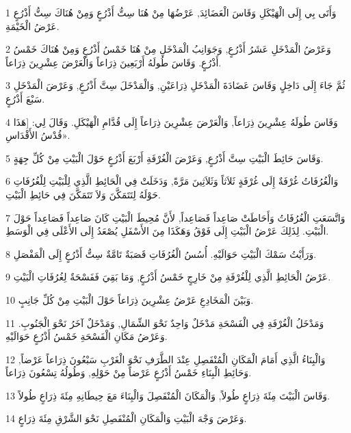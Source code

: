 \par 1 وَأَتَى بِي إِلَى الْهَيْكَلِ وَقَاسَ الْعَضَائِدَ, عَرْضُهَا مِنْ هُنَا سِتُّ أَذْرُعٍ وَمِنْ هُنَاكَ سِتُّ أَذْرُعٍ عَرْضُ الْخَيْمَةِ.
\par 2 وَعَرْضُ الْمَدْخَلِ عَشَرُ أَذْرُعٍ, وَجَوَانِبُ الْمَدْخَلِ مِنْ هُنَا خَمْسُ أَذْرُعٍ وَمِنْ هُنَاكَ خَمْسُ أَذْرُعٍ. وَقَاسَ طُولَهُ أَرْبَعِينَ ذِرَاعاً وَالْعَرْضَ عِشْرِينَ ذِرَاعاً.
\par 3 ثُمَّ جَاءَ إِلَى دَاخِلٍ وَقَاسَ عَضَادَةَ الْمَدْخَلِ ذِرَاعَيْنِ, وَالْمَدْخَلَ سِتَّ أَذْرُعٍ, وَعَرْضَ الْمَدْخَلِ سَبْعَ أَذْرُعٍ.
\par 4 وَقَاسَ طُولَهُ عِشْرِينَ ذِرَاعاً, وَالْعَرْضَ عِشْرِينَ ذِرَاعاً إِلَى قُدَّامِ الْهَيْكَلِ. وَقَالَ لِي: [هَذَا قُدْسُ الأَقْدَاسِ».
\par 5 وَقَاسَ حَائِطَ الْبَيْتِ سِتَّ أَذْرُعٍ, وَعَرْضَ الْغُرْفَةِ أَرْبَعَ أَذْرُعٍ حَوْلَ الْبَيْتِ مِنْ كُلِّ جِهَةٍ.
\par 6 وَالْغُرُفَاتُ غُرْفَةٌ إِلَى غُرْفَةٍ ثَلاَثاً وَثَلاَثِينَ مَرَّةً, وَدَخَلَتْ فِي الْحَائِطِ الَّذِي لِلْبَيْتِ لِلْغُرُفَاتِ حَوْلَهُ لِتَتَمَكَّنَ وَلاَ تَتَمَكَّنَ فِي حَائِطِ الْبَيْتِ.
\par 7 وَاتَّسَعَتِ الْغُرُفَاتُ وَأَحَاطَتْ صَاعِداً فَصَاعِداً, لأَنَّ مُحِيطَ الْبَيْتِ كَانَ صَاعِداً فَصَاعِداً حَوْلَ الْبَيْتِ. لِذَلِكَ عَرْضُ الْبَيْتِ إِلَى فَوْقُ وَهَكَذَا مِنَ الأَسْفَلِ يُصْعَدُ إِلَى الأَعْلَى فِي الْوَسَطِ.
\par 8 وَرَأَيْتُ سَمْكَ الْبَيْتِ حَوَالَيْهِ. أُسُسُ الْغُرُفَاتِ قَصَبَةٌ تَامَّةٌ سِتُّ أَذْرُعٍ إِلَى الْمَفْصَلِ.
\par 9 عَرْضُ الْحَائِطِ الَّذِي لِلْغُرْفَةِ مِنْ خَارِجٍ خَمْسُ أَذْرُعٍ, وَمَا بَقِيَ فَفَسْحَةٌ لِغُرُفَاتِ الْبَيْتِ.
\par 10 وَبَيْنَ الْمَخَادِعِ عَرْضُ عِشْرِينَ ذِرَاعاً حَوْلَ الْبَيْتِ مِنْ كُلِّ جَانِبٍ.
\par 11 وَمَدْخَلُ الْغُرْفَةِ فِي الْفَسْحَةِ مَدْخَلٌ وَاحِدٌ نَحْوَ الشِّمَالِ, وَمَدْخَلٌ آخَرُ نَحْوَ الْجَنُوبِ. وَعَرْضُ مَكَانِ الْفَسْحَةِ خَمْسُ أَذْرُعٍ حَوَالَيْهِ.
\par 12 وَالْبِنَاءُ الَّذِي أَمَامَ الْمَكَانِ الْمُنْفَصِلِ عِنْدَ الطَّرَفِ نَحْوَ الْغَرْبِ سَبْعُونَ ذِرَاعاً عَرْضاً, وَحَائِطِ الْبِنَاءِ خَمْسُ أَذْرُعٍ عَرْضاً مِنْ حَوْلِهِ, وَطُولُهُ تِسْعُونَ ذِرَاعاً.
\par 13 وَقَاسَ الْبَيْتَ مِئَةَ ذِرَاعٍ طُولاً, وَالْمَكَانَ الْمُنْفَصِلَ وَالْبِنَاءَ مَعَ حِيطَانِهِ مِئَةَ ذِرَاعٍ طُولاً.
\par 14 وَعَرْضَ وَجْهَ الْبَيْتِ وَالْمَكَانِ الْمُنْفَصِلِ نَحْوَ الشَّرْقِ مِئَةَ ذِرَاعٍ.
